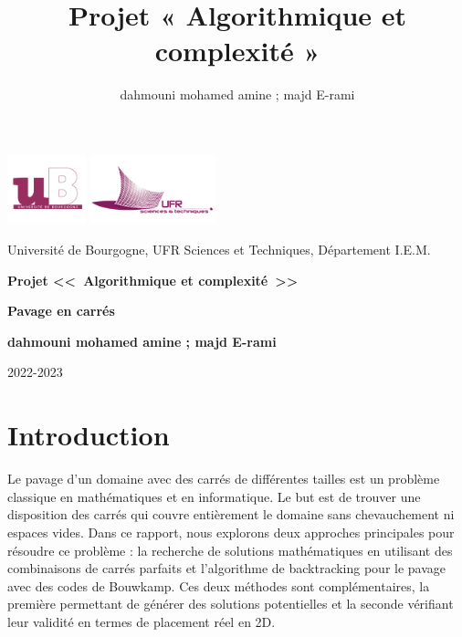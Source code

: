 \documentclass{article}
\title{Projet « Algorithmique et complexité »}
\author{dahmouni mohamed amine ; majd E-rami}
\begin{document}
\begin{titlepage}
\includegraphics[height=2cm]{image/logo-ub.png}
\hfill
\includegraphics[height=2cm]{image/logo-ufr.png}


\begin{center}
{\large{Université de Bourgogne, UFR Sciences et Techniques, Département I.E.M.}\par}

\vspace{1cm}
{\huge\bfseries Projet <<\ Algorithmique et complexité\ >>}\par
{\huge\bfseries Pavage en carrés}\par
{\bfseries dahmouni mohamed amine ; majd E-rami}\par

\end{center}
\tableofcontents

\vfill
{\hfill\large 2022-2023\par}

\end{titlepage}


\section{Introduction}

Le pavage d'un domaine avec des carrés de différentes tailles est un problème classique en mathématiques et en informatique. Le but est de trouver une disposition des carrés qui couvre entièrement le domaine sans chevauchement ni espaces vides. Dans ce rapport, nous explorons deux approches principales pour résoudre ce problème : la recherche de solutions mathématiques en utilisant des combinaisons de carrés parfaits et l'algorithme de backtracking pour le pavage avec des codes de Bouwkamp. Ces deux méthodes sont complémentaires, la première permettant de générer des solutions potentielles et la seconde vérifiant leur validité en termes de placement réel en 2D.
\end{document}
